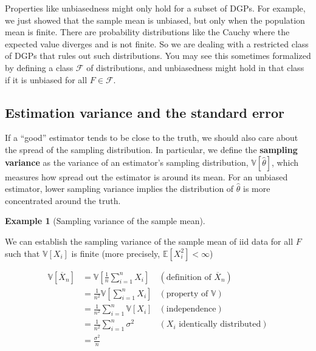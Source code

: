 \documentclass[
  letterpaper,
  DIV=11,
  numbers=noendperiod]{scrreprt}
\newcommand{\E}{\mathbb{E}}
\newcommand{\V}{\mathbb{V}}
\newcommand{\Xbar}{\overline{X}}
\theoremstyle{definition}
\theoremstyle{plain}
\theoremstyle{definition}
\newtheorem{example}{Example}[chapter]
\theoremstyle{remark}
\begin{document}
\begin{tcolorbox}[enhanced jigsaw, opacitybacktitle=0.6, bottomrule=.15mm, colback=white, colframe=quarto-callout-warning-color-frame, arc=.35mm, opacityback=0, breakable, leftrule=.75mm, titlerule=0mm, left=2mm, rightrule=.15mm, toptitle=1mm, bottomtitle=1mm, toprule=.15mm, title=\textcolor{quarto-callout-warning-color}{\faExclamationTriangle}\hspace{0.5em}{Warning}, colbacktitle=quarto-callout-warning-color!10!white, coltitle=black]

Properties like unbiasedness might only hold for a subset of DGPs. For
example, we just showed that the sample mean is unbiased, but only when
the population mean is finite. There are probability distributions like
the Cauchy where the expected value diverges and is not finite. So we
are dealing with a restricted class of DGPs that rules out such
distributions. You may see this sometimes formalized by defining a class
\(\mathcal{F}\) of distributions, and unbiasedness might hold in that
class if it is unbiased for all \(F \in \mathcal{F}\).

\end{tcolorbox}

\hypertarget{estimation-variance-and-the-standard-error}{%
\subsection{Estimation variance and the standard
error}\label{estimation-variance-and-the-standard-error}}

If a ``good'' estimator tends to be close to the truth, we should also
care about the spread of the sampling distribution. In particular, we
define the \textbf{sampling variance} as the variance of an estimator's
sampling distribution, \(\V[\widehat{\theta}]\), which measures how
spread out the estimator is around its mean. For an unbiased estimator,
lower sampling variance implies the distribution of \(\widehat{\theta}\)
is more concentrated around the truth.

\begin{example}[Sampling variance of the sample
mean]\protect\hypertarget{exm-mean-var}{}\label{exm-mean-var}

We can establish the sampling variance of the sample mean of iid data
for all \(F\) such that \(\V[X_i]\) is finite (more precisely,
\(\E[X_i^2] < \infty\))

\[\begin{aligned}
  \V\left[ \Xbar_n \right] &= \V\left[ \frac{1}{n} \sum_{i=1}^n X_i \right] & (\text{definition of } \Xbar_n) \\
                           &= \frac{1}{n^2} \V\left[ \sum_{i=1}^n X_i \right] & (\text{property of } \V) \\
                           &= \frac{1}{n^2} \sum_{i=1}^n \V[X_i] & (\text{independence}) \\
                           &= \frac{1}{n^2} \sum_{i=1}^n \sigma^2 & (X_i \text{ identically distributed}) \\
                           &= \frac{\sigma^2}{n}
\end{aligned}\]

\end{example}
\end{document}
